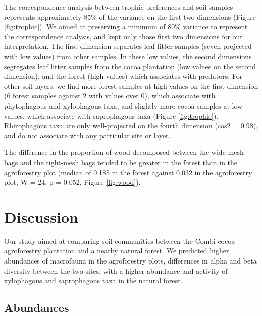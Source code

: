 \documentclass[fleqn,10pt]{ArtEcoFoG} %
\begin{document}
\normalsize

The correspondence analysis between trophic preferences and soil samples represents approximately 85\% of the variance on the first two dimensions (Figure \ref{fig:trophic}). We aimed at preserving a minimum of 80\% variance to represent the correspondence analysis, and kept only those first two dimensions for our interpretation. The first-dimension separates leaf litter samples (seven projected with low values) from other samples. In these low values, the second dimensions segregates leaf litter samples from the cocoa plantation (low values on the second dimension), and the forest (high values) which associates with predators. For other soil layers, we find more forest samples at high values on the first dimension (6 forest samples against 2 with values over 0), which associate with phytophagous and xylophagous taxa, and slightly more cocoa samples at low values, which associate with saprophagous taxa (Figure \ref{fig:trophic}). Rhizophagous taxa are only well-projected on the fourth dimension (cos2 = 0.98), and do not associate with any particular site or layer.

The difference in the proportion of wood decomposed between the wide-mesh bags and the tight-mesh bags tended to be greater in the forest than in the agroforestry plot (median of 0.185 in the forest against 0.032 in the agroforestry plot, W = 24, p = 0.052, Figure \ref{fig:wood}).

\section{Discussion}\label{discussion}

Our study aimed at comparing soil communities between the Combi cocoa agroforestry plantation and a nearby natural forest. We predicted higher abundances of macrofauna in the agroforestry plots, differences in alpha and beta diversity between the two sites, with a higher abundance and activity of xylophagous and saprophagous taxa in the natural forest.

\subsection{Abundances}\label{abundances}
\end{document}
